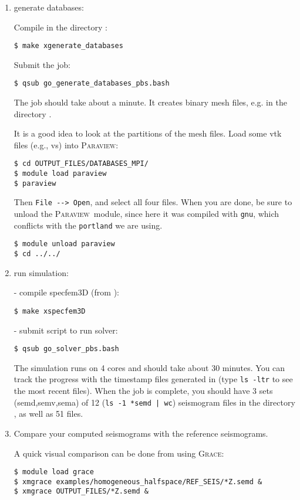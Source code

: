 \documentclass[10pt,fleqn,letterpaper]{article}
\newcommand{\paraview}{\textsc{Paraview}}
\newcommand{\grace}{\textsc{Grace}}
\begin{document}
\begin{enumerate}
\item generate databases:

Compile  in the directory :
\begin{lstlisting}
$ make xgenerate_databases
\end{lstlisting}
Submit the job:
\begin{lstlisting}
$ qsub go_generate_databases_pbs.bash
\end{lstlisting}

The job should take about a minute.
It creates binary mesh files, e.g.  in the directory .

It is a good idea to look at the partitions of the mesh files. Load some vtk files (e.g., vs) into \paraview:
\begin{lstlisting}
$ cd OUTPUT_FILES/DATABASES_MPI/
$ module load paraview
$ paraview
\end{lstlisting}
%
Then \verb+File --> Open+, and select all four  files. When you are done, be sure to unload the \paraview\ module, since here it was compiled with \verb+gnu+, which conflicts with the \verb+portland+ we are using.
%
\begin{lstlisting}
$ module unload paraview
$ cd ../../
\end{lstlisting}

\item run simulation:

   - compile specfem3D (from ):
\begin{lstlisting}
$ make xspecfem3D
\end{lstlisting}
   - submit script to run solver:
\begin{lstlisting}
$ qsub go_solver_pbs.bash
\end{lstlisting}

The simulation runs on 4 cores and should take about 30 minutes. You can track the progress with the timestamp files generated in  (type \texttt{ls -ltr} to see the most recent files). When the job is complete, you should have 3 sets (semd,semv,sema) of 12 (\texttt{ls -1 *semd | wc}) seismogram files in the directory , as well as 51  files.

\item Compare your computed seismograms with the reference seismograms.

A quick visual comparison can be done from  using \grace:
\begin{lstlisting}
$ module load grace
$ xmgrace examples/homogeneous_halfspace/REF_SEIS/*Z.semd &
$ xmgrace OUTPUT_FILES/*Z.semd &
\end{lstlisting}

\end{enumerate}
\end{document}
